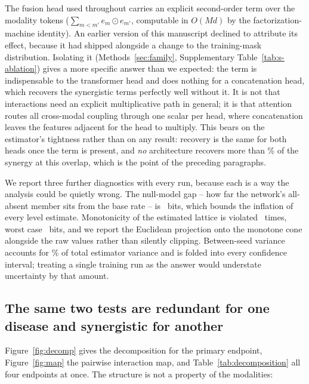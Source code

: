 \documentclass[11pt]{article}
\theoremstyle{definition}
\theoremstyle{remark}
\begin{document}
The fusion head used throughout carries an explicit second-order term over the
modality tokens ($\sum_{m<m'} e_m \odot e_{m'}$, computable in $O(Md)$ by the
factorization-machine identity). An earlier version of this manuscript declined
to attribute its effect, because it had shipped alongside a change to the
training-mask distribution. Isolating it (Methods~\ref{sec:family},
Supplementary Table~\ref{tab:s-ablation}) gives a more specific answer than we
expected: the term is indispensable to the transformer head and does nothing
for a concatenation head, which recovers the synergistic terms perfectly well
without it. It is not that interactions need an explicit multiplicative path in
general; it is that attention routes all cross-modal coupling through one
scalar per head, where concatenation leaves the features adjacent for the head
to multiply. This bears on the estimator's
tightness rather than on any result: recovery is the same for both heads once
the term is present, and \emph{no} architecture recovers more than
\ablConcatFmSynHi\% of the synergy at this overlap, which is the point of the
preceding paragraphs.

We report three further diagnostics with every run, because each is a way the
analysis could be quietly wrong. The null-model gap -- how far the network's
all-absent member sits from the base rate -- is \primaryNullGap\ bits, which
bounds the inflation of every level estimate. Monotonicity of the estimated
lattice is violated \primaryMonoViolations\ times, worst case
\primaryMonoWorst\ bits, and we report the Euclidean projection onto the monotone
cone alongside the raw values rather than silently clipping. Between-seed
variance accounts for \primarySeedShare\% of total estimator variance and is
folded into every confidence interval; treating a single training run as the
answer would understate uncertainty by that amount.

\subsection{The same two tests are redundant for one disease and synergistic for another}

Figure~\ref{fig:decomp} gives the decomposition for the primary endpoint,
Figure~\ref{fig:map} the pairwise interaction map, and
Table~\ref{tab:decomposition} all four endpoints at once. The structure is not a
property of the modalities:
\end{document}
